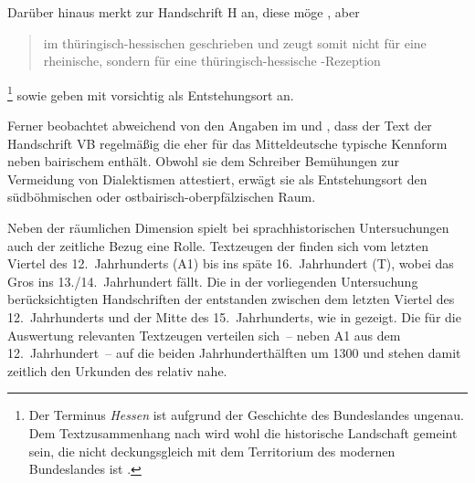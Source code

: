 Darüber hinaus merkt \citet{klein1988} zur Handschrift H an, diese möge
, aber
\blockcquote[118]{klein1988}{im
thüringisch-hessischen 
ge\-schrie\-ben und zeugt somit nicht für eine rheinische, sondern für eine
thüringisch-hessische
\nocite{schroeder1895}-Rezeption}.%
%
	\footnote{Der Terminus \emph{Hessen} ist aufgrund der Geschichte des
	Bundeslandes ungenau. Dem Textzusammenhang nach wird wohl die historische
	Landschaft gemeint sein, die nicht deckungsgleich mit dem Territorium des
	modernen Bundeslandes ist \autocite[vgl.~z.\,B.][853]{wiesinger1983}.}
%
\citet{kcdigital} sowie \citet[23]{wolf:kckat} geben mit
\citet[237--238]{millerzimmermann2007} vorsichtig  als
Entstehungsort an.

%
\label{phsec:vbherkunft}%
Ferner beobachtet \citet[226]{schneider1987} abweichend von den Angaben im
 und \citet{kcdigital}, dass der Text der Handschrift VB
regelmäßig die eher für das Mitteldeutsche typische Kennform
  neben bairischem  enthält.
Obwohl sie dem Schreiber Bemühungen zur Vermeidung von Dialektismen attestiert,
erwägt sie als Entstehungsort den südböhmischen oder
ost\-bairisch-ober\-pfälzischen Raum.

Neben der räumlichen Dimension spielt bei sprachhistorischen Untersuchungen
auch der zeitliche Bezug eine Rolle. Textzeugen der
\KC{} finden sich vom letzten Viertel des 12.~Jahrhunderts (A1) bis ins späte
16.~Jahrhundert (T), wobei das Gros ins 13./14.~Jahrhundert fällt. Die in der
vorliegenden Untersuchung berücksichtigten Handschriften der \KC{} entstanden
zwischen dem letzten Viertel des 12.~Jahrhunderts und der Mitte des
15.~Jahrhunderts, wie in  gezeigt. Die für die
Auswertung relevanten Textzeugen verteilen sich~-- neben A1 aus dem
12.~Jahrhundert~-- auf die beiden Jahrhunderthälften um 1300 und stehen damit
zeitlich den Urkunden des \CAO{} relativ nahe.

